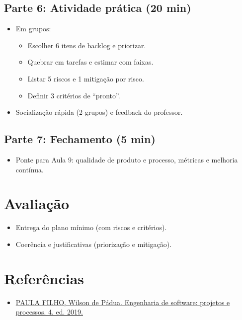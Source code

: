 \documentclass[12pt,a4paper]{article}
\begin{document}
\subsection*{Parte 6: Atividade prática (20 min)}
\begin{itemize}[leftmargin=*,itemsep=0.35em]
  \item Em grupos:
  \begin{itemize}[leftmargin=*,itemsep=0.25em]
    \item Escolher 6 itens de backlog e priorizar.
    \item Quebrar em tarefas e estimar com faixas.
    \item Listar 5 riscos e 1 mitigação por risco.
    \item Definir 3 critérios de ``pronto''.
  \end{itemize}
  \item Socialização rápida (2 grupos) e feedback do professor.
\end{itemize}

\subsection*{Parte 7: Fechamento (5 min)}
\begin{itemize}[leftmargin=*,itemsep=0.35em]
  \item Ponte para Aula 9: qualidade de produto e processo, métricas e melhoria contínua.
\end{itemize}

\section{Avaliação}
\begin{itemize}[leftmargin=*,itemsep=0.25em]
  \item Entrega do plano mínimo (com riscos e critérios).
  \item Coerência e justificativas (priorização e mitigação).
\end{itemize}

\section{Referências}
\begin{itemize}[leftmargin=*,itemsep=0.25em]
  \item \href{../99-Materiais/Engenharia%20de%20software%20projetos%20e%20processos%20by%20Wilson%20de%20P%C3%A1dua%20Paula%20Filho%20.epub.pdf}{PAULA FILHO, Wilson de Pádua. Engenharia de software: projetos e processos. 4. ed. 2019.}
\end{itemize}
\end{document}
